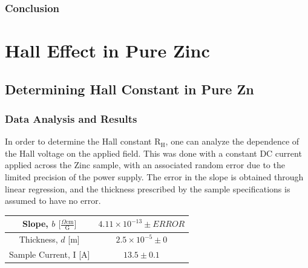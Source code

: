 \documentclass[a4paper]{article}
\begin{document}

\subsubsection{Conclusion}

\section{Hall Effect in Pure Zinc}

\subsection{Determining Hall Constant in Pure Zn}

\subsubsection{Data Analysis and Results}
\qq In order to determine the Hall constant $\text{R}_\text{H}$, one can
analyze the dependence of the Hall voltage on the applied field. This
was done with a constant DC current applied across the Zinc sample, with
an associated random error due to the limited precision of the power
supply. The error in the slope is obtained through linear regression,
and the thickness prescribed by the sample specifications is assumed
to have no error.

\begin{center}
\begin{tabular}{|c|c|}
\hline
Slope, $b$ $\big[  \frac{\Omega \text{cm}}{\text{G}} \big] $ & $4.11 \times 10^{-13} \pm ERROR$ \topVspace \bottomVspace \\
\hline
Thickness, $d$ [m] & $2.5 \times 10^{-5} \pm 0$ \topVspace \bottomVspace \\
\hline
Sample Current, I [A] & $13.5 \pm 0.1$ \topVspace \bottomVspace \\
\hline
\end{tabular}
\label{table:zinc_RH}
\end{center}
\end{document}
